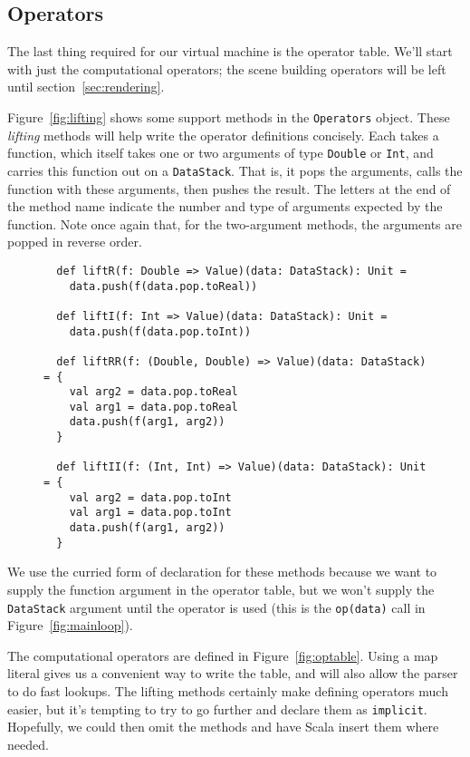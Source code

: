\subsection{Operators\label{sec:operators}}

The last thing required for our virtual machine is the operator table.
We'll start with just the computational operators;
the scene building operators will be left until section~\ref{sec:rendering}.

Figure~\ref{fig:lifting} shows some support methods
in the \verb!Operators! object.
These \emph{lifting} methods will help
write the operator definitions concisely.
Each takes a function,
which itself takes one or two arguments
of type \verb!Double! or \verb!Int!,
and carries this function out on a \verb!DataStack!.
That is,
it pops the arguments,
calls the function with these arguments,
then pushes the result.
The letters at the end of the method name indicate
the number and type of arguments expected by the function.
Note once again that,
for the two-argument methods,
the arguments are popped in reverse order.

\begin{figure}
\begin{verbatim}
  def liftR(f: Double => Value)(data: DataStack): Unit =
    data.push(f(data.pop.toReal))

  def liftI(f: Int => Value)(data: DataStack): Unit =
    data.push(f(data.pop.toInt))

  def liftRR(f: (Double, Double) => Value)(data: DataStack) = {
    val arg2 = data.pop.toReal
    val arg1 = data.pop.toReal
    data.push(f(arg1, arg2))
  }

  def liftII(f: (Int, Int) => Value)(data: DataStack): Unit = {
    val arg2 = data.pop.toInt
    val arg1 = data.pop.toInt
    data.push(f(arg1, arg2))
  }
\end{verbatim}
\getcaption
\end{figure}

We use the curried form of declaration for these methods
because we want to supply the function argument in the operator table,
but we won't supply the \verb!DataStack! argument until the operator is used
(this is the \verb!op(data)! call in Figure~\ref{fig:mainloop}).

The computational operators are defined in Figure~\ref{fig:optable}.
Using a map literal gives us a convenient way to write the table,
and will also allow the parser to do fast lookups.
The lifting methods certainly make defining operators much easier,
but it's tempting to try to go further and declare them as \verb!implicit!.
Hopefully, we could then omit the methods
and have Scala insert them where needed.

